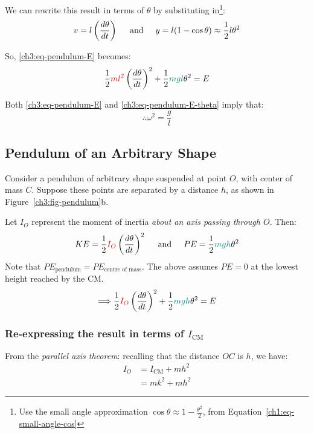We can rewrite this result in terms of $\theta$ by substituting in\footnote{Use the small angle approximation $\cos\theta \approx 1-\frac{\theta^2}{2}$, from Equation~\eqref{ch1:eq-small-angle-cos}}:
\begin{equation*}
v = l\left(\frac{d\theta}{dt}\right) \hspace{0.5cm}\text{and}\hspace{0.5cm}
y = l(1-\cos\theta) \approx \frac{1}{2}l\theta ^2
\end{equation*}

So, \eqref{ch3:eq-pendulum-E} becomes:
\begin{equation}
	\frac{1}{2} \textcolor{red}{ml^2} \left( \frac{d\theta}{dt} \right)^2 + \frac{1}{2} \textcolor{teal}{mgl} \theta^2 = E \label{ch3:eq-pendulum-E-theta}
\end{equation}

Both \eqref{ch3:eq-pendulum-E} and \eqref{ch3:eq-pendulum-E-theta} imply that:
\begin{equation}
	\therefore \omega^2 = \frac{g}{l} \label{ch3:eq-simple-pendulum-result}
\end{equation}


\subsection{Pendulum of an Arbitrary Shape} \label{ch3:sec-complex-pendulum}
Consider a pendulum of arbitrary shape suspended at point $O$, with center of mass $C$. Suppose these points are separated by a distance $h$, as shown in Figure~\ref{ch3:fig-pendulum}b.

Let $I_O$ represent the moment of inertia \emph{about an axis passing through $O$}. Then:
\begin{equation*}
KE = \frac{1}{2} \textcolor{red}{I_O}\left( \frac{d\theta}{dt} \right)^2 \hspace{0.5cm}\text{and}\hspace{0.5cm}
PE = \frac{1}{2} \textcolor{teal}{mgh}\theta^2 
\end{equation*}
Note that $PE_\text{pendulum} = PE_\text{centre of mass}$. The above assumes $PE = 0$ at the lowest height reached by the CM.
\begin{equation} 
	\Longrightarrow
	\frac{1}{2} \textcolor{red}{I_O}\left( \frac{d\theta}{dt} \right)^2 + \frac{1}{2} \textcolor{teal}{mgh}\theta^2 = E \label{ch3:eq-pendulumEO}
\end{equation}

\subsubsection{Re-expressing the result in terms of $I_\text{CM}$}
From the \emph{parallel axis theorem}: recalling that the distance $OC$ is $h$, we have:
\begin{align*}
	I_O &= I_\text{CM} + mh^2 \\
	&= mk^2 + mh^2
\end{align*}

